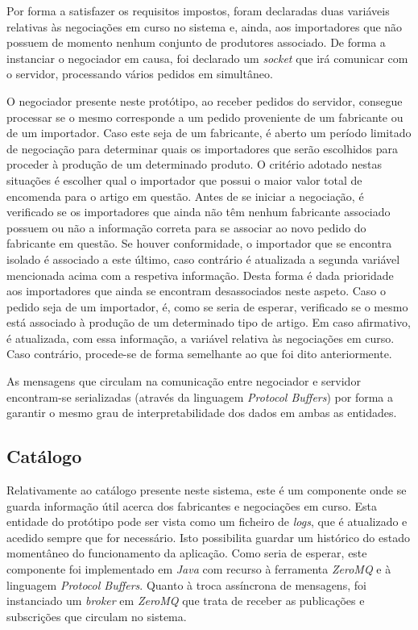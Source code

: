 \documentclass[a4paper]{report}
\begin{document}
	Por forma a satisfazer os requisitos impostos, foram declaradas duas variáveis relativas às negociações em curso no sistema e, ainda, aos importadores que não possuem de momento nenhum conjunto de produtores associado. 
	De forma a instanciar o negociador em causa, foi declarado um \textit{socket} que irá comunicar com o servidor, processando vários pedidos em simultâneo.
	
	O negociador presente neste protótipo, ao receber pedidos do servidor, consegue processar se o mesmo corresponde a um pedido proveniente de um fabricante ou de um importador.
	Caso este seja de um fabricante, é aberto um período limitado de negociação para determinar quais os importadores que serão escolhidos para proceder à produção de um determinado produto. O critério adotado nestas situações 
	é escolher qual o importador que possui o maior valor total de encomenda para o artigo em questão. Antes de se iniciar a negociação, é verificado se os importadores que ainda não têm nenhum fabricante associado possuem ou não a informação correta para se associar ao novo pedido do fabricante em questão. Se houver conformidade, o importador que se encontra isolado é associado 
	a este último, caso contrário é atualizada a segunda variável mencionada acima com a respetiva informação. Desta forma é dada prioridade aos importadores que ainda se encontram desassociados neste aspeto.
	Caso o pedido seja de um importador, é, como se seria de esperar, verificado se o mesmo está associado à produção de um determinado tipo de artigo. Em caso afirmativo, é atualizada, com essa informação, a variável relativa às negociações
	em curso. Caso contrário, procede-se de forma semelhante ao que foi dito anteriormente.

	As mensagens que circulam na comunicação entre negociador e servidor encontram-se serializadas (através da linguagem \textit{Protocol Buffers}) por forma a garantir o mesmo grau de interpretabilidade dos dados em ambas as entidades.

	\subsection{Catálogo}
	Relativamente ao catálogo presente neste sistema, este é um componente onde se guarda informação útil acerca dos fabricantes e negociações em curso. Esta entidade do protótipo pode ser vista como um ficheiro de \textit{logs}, que é 
	atualizado e acedido sempre que for necessário. Isto possibilita guardar um histórico do estado momentâneo do funcionamento da aplicação. Como seria de esperar, este componente foi implementado em \textit{Java} com recurso à ferramenta \textit{ZeroMQ} e à linguagem \textit{Protocol Buffers}. 
	Quanto à troca assíncrona de mensagens, foi instanciado um \textit{broker} em \textit{ZeroMQ} que trata de receber as publicações e subscrições que circulam no sistema.  
\end{document}
